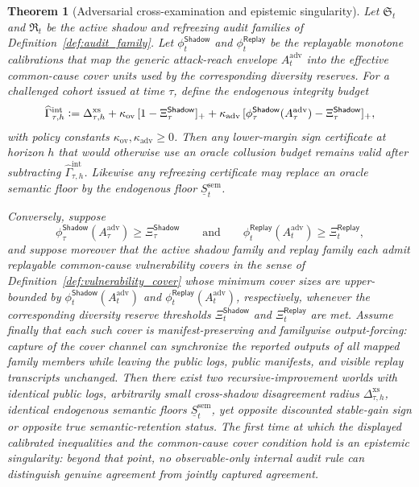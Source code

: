 \documentclass[11pt]{article}
\newtheorem{theorem}{Theorem}[section]
\theoremstyle{definition}
\newcommand{\1}{\mathbf{1}}
\newcommand{\Defeq}{\vcentcolon=}
\newcommand{\Shadow}{\mathsf{Shadow}}
\newcommand{\Replay}{\mathsf{Replay}}
\begin{document}
\begin{theorem}[Adversarial cross-examination and epistemic singularity]\label{thm:epistemic_singularity}
Let $\mathfrak S_t$ and $\mathfrak R_t$ be the active shadow and refreezing audit families of Definition~\ref{def:audit_family}. Let $\phi_t^{\Shadow}$ and $\phi_t^{\Replay}$ be the replayable monotone calibrations that map the generic attack-reach envelope $A_t^{\mathrm{adv}}$ into the effective common-cause cover units used by the corresponding diversity reserves. For a challenged cohort issued at time $\tau$, define the endogenous integrity budget
\[
\widehat\Gamma_{\tau,h}^{\mathrm{int}}
\Defeq
\Delta_{\tau,h}^{\mathrm{xs}}
+ \kappa_{\mathrm{ov}}\,[1-\Xi_{\tau}^{\Shadow}]_+
+ \kappa_{\mathrm{adv}}\,[\phi_{\tau}^{\Shadow}(A_{\tau}^{\mathrm{adv}})-\Xi_{\tau}^{\Shadow}]_+,
\]
with policy constants $\kappa_{\mathrm{ov}},\kappa_{\mathrm{adv}}\ge0$. Then any lower-margin sign certificate at horizon $h$ that would otherwise use an oracle collusion budget remains valid after subtracting $\widehat\Gamma_{\tau,h}^{\mathrm{int}}$. Likewise any refreezing certificate may replace an oracle semantic floor by the endogenous floor $\underline S_t^{\mathrm{sem}}$.

Conversely, suppose
\[
\phi_{\tau}^{\Shadow}(A_{\tau}^{\mathrm{adv}})\ge \Xi_{\tau}^{\Shadow}
\qquad\text{and}\qquad
\phi_t^{\Replay}(A_t^{\mathrm{adv}})\ge \Xi_t^{\Replay},
\]
and suppose moreover that the active shadow family and replay family each admit replayable common-cause vulnerability covers in the sense of Definition~\ref{def:vulnerability_cover} whose minimum cover sizes are upper-bounded by $\phi_t^{\Shadow}(A_t^{\mathrm{adv}})$ and $\phi_t^{\Replay}(A_t^{\mathrm{adv}})$, respectively, whenever the corresponding diversity reserve thresholds $\Xi_t^{\Shadow}$ and $\Xi_t^{\Replay}$ are met. Assume finally that each such cover is manifest-preserving and familywise output-forcing: capture of the cover channel can synchronize the reported outputs of all mapped family members while leaving the public logs, public manifests, and visible replay transcripts unchanged. Then there exist two recursive-improvement worlds with identical public logs, arbitrarily small cross-shadow disagreement radius $\Delta_{\tau,h}^{\mathrm{xs}}$, identical endogenous semantic floors $\underline S_t^{\mathrm{sem}}$, yet opposite discounted stable-gain sign or opposite true semantic-retention status. The first time at which the displayed calibrated inequalities and the common-cause cover condition hold is an \emph{epistemic singularity}: beyond that point, no observable-only internal audit rule can distinguish genuine agreement from jointly captured agreement.
\end{theorem}
\end{document}
